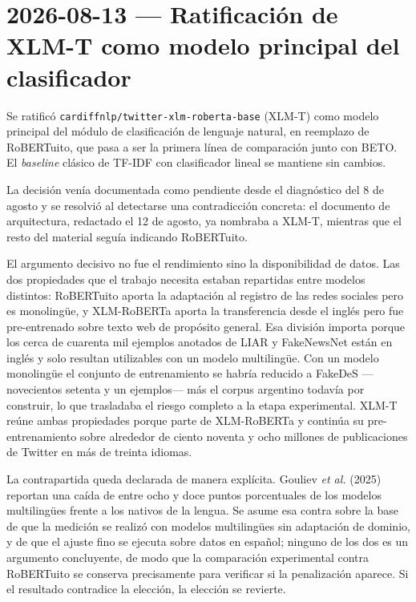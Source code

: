 \section{2026-08-13 — Ratificación de XLM-T como modelo principal del clasificador}

Se ratificó \texttt{cardiffnlp/twitter-xlm-roberta-base} (XLM-T) como modelo principal del módulo de clasificación de lenguaje natural, en reemplazo de RoBERTuito, que pasa a ser la primera línea de comparación junto con BETO. El \textit{baseline} clásico de TF-IDF con clasificador lineal se mantiene sin cambios.

La decisión venía documentada como pendiente desde el diagnóstico del 8 de agosto y se resolvió al detectarse una contradicción concreta: el documento de arquitectura, redactado el 12 de agosto, ya nombraba a XLM-T, mientras que el resto del material seguía indicando RoBERTuito.

El argumento decisivo no fue el rendimiento sino la disponibilidad de datos. Las dos propiedades que el trabajo necesita estaban repartidas entre modelos distintos: RoBERTuito aporta la adaptación al registro de las redes sociales pero es monolingüe, y XLM-RoBERTa aporta la transferencia desde el inglés pero fue pre-entrenado sobre texto web de propósito general. Esa división importa porque los cerca de cuarenta mil ejemplos anotados de LIAR y FakeNewsNet están en inglés y solo resultan utilizables con un modelo multilingüe. Con un modelo monolingüe el conjunto de entrenamiento se habría reducido a FakeDeS —novecientos setenta y un ejemplos— más el corpus argentino todavía por construir, lo que trasladaba el riesgo completo a la etapa experimental. XLM-T reúne ambas propiedades porque parte de XLM-RoBERTa y continúa su pre-entrenamiento sobre alrededor de ciento noventa y ocho millones de publicaciones de Twitter en más de treinta idiomas.

La contrapartida queda declarada de manera explícita. Gouliev \textit{et al.} (2025) reportan una caída de entre ocho y doce puntos porcentuales de los modelos multilingües frente a los nativos de la lengua. Se asume esa contra sobre la base de que la medición se realizó con modelos multilingües sin adaptación de dominio, y de que el ajuste fino se ejecuta sobre datos en español; ninguno de los dos es un argumento concluyente, de modo que la comparación experimental contra RoBERTuito se conserva precisamente para verificar si la penalización aparece. Si el resultado contradice la elección, la elección se revierte.

